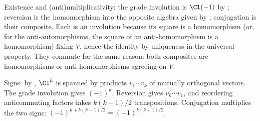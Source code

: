 Existence and (anti)multiplicativity: the grade involution is $\Cl(-1)$ by ; reversion is the homomorphism into the opposite algebra given by ; conjugation is their composite. Each is an involution because its square is a homomorphism (or, for the anti-automorphisms, the square of an anti-homomorphism is a homomorphism) fixing $V$, hence the identity by uniqueness in the universal property. They commute for the same reason: both composites are homomorphisms or anti-homomorphisms agreeing on $V$.

Signs: by , $\Cl^{k}$ is spanned by products $v_1 \cdots v_k$ of mutually orthogonal vectors. The grade involution gives $(-1)^{k}$. Reversion gives $v_k \cdots v_1$, and reordering anticommuting factors takes $k(k-1)/2$ transpositions. Conjugation multiplies the two signs: $(-1)^{k + k(k-1)/2} = (-1)^{k(k+1)/2}$.

